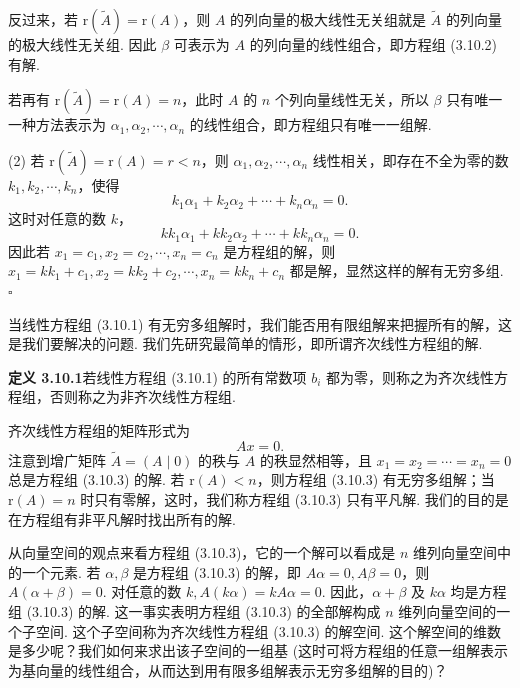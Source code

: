 \documentclass[UTF8,12pt,a4paper,fontset=fandol]{ctexart}
\begin{document}
反过来，若 $\mathrm{r}(\widetilde{A})=\mathrm{r}(A)$，则 $A$ 的列向量的极大线性无关组就是 $\widetilde{A}$ 的列向量的极大线性无关组. 因此 $\beta$ 可表示为 $A$ 的列向量的线性组合，即方程组 (3.10.2) 有解.

若再有 $\mathrm{r}(\widetilde{A})=\mathrm{r}(A)=n$，此时 $A$ 的 $n$ 个列向量线性无关，所以 $\beta$ 只有唯一一种方法表示为 $\alpha_1,\alpha_2,\cdots,\alpha_n$ 的线性组合，即方程组只有唯一一组解.

(2) 若 $\mathrm{r}(\widetilde{A})=\mathrm{r}(A)=r<n$，则 $\alpha_1,\alpha_2,\cdots,\alpha_n$ 线性相关，即存在不全为零的数 $k_1,k_2,\cdots,k_n$，使得
\[
k_1\alpha_1+k_2\alpha_2+\cdots+k_n\alpha_n=0.
\]
这时对任意的数 $k$，
\[
kk_1\alpha_1+kk_2\alpha_2+\cdots+kk_n\alpha_n=0.
\]
因此若 $x_1=c_1,x_2=c_2,\cdots,x_n=c_n$ 是方程组的解，则 $x_1=kk_1+c_1,x_2=kk_2+c_2,\cdots,x_n=kk_n+c_n$ 都是解，显然这样的解有无穷多组. $\square$

当线性方程组 (3.10.1) 有无穷多组解时，我们能否用有限组解来把握所有的解，这是我们要解决的问题. 我们先研究最简单的情形，即所谓齐次线性方程组的解.

\noindent\textbf{定义 3.10.1}\quad 若线性方程组 (3.10.1) 的所有常数项 $b_i$ 都为零，则称之为齐次线性方程组，否则称之为非齐次线性方程组.

齐次线性方程组的矩阵形式为
\begin{equation}
Ax=0.
\tag{3.10.3}
\end{equation}
注意到增广矩阵 $\widetilde{A}=(A\mid 0)$ 的秩与 $A$ 的秩显然相等，且 $x_1=x_2=\cdots=x_n=0$ 总是方程组 (3.10.3) 的解. 若 $\mathrm{r}(A)<n$，则方程组 (3.10.3) 有无穷多组解；当 $\mathrm{r}(A)=n$ 时只有零解，这时，我们称方程组 (3.10.3) 只有平凡解. 我们的目的是在方程组有非平凡解时找出所有的解.

从向量空间的观点来看方程组 (3.10.3)，它的一个解可以看成是 $n$ 维列向量空间中的一个元素. 若 $\alpha,\beta$ 是方程组 (3.10.3) 的解，即 $A\alpha=0,A\beta=0$，则 $A(\alpha+\beta)=0$. 对任意的数 $k,A(k\alpha)=kA\alpha=0$. 因此，$\alpha+\beta$ 及 $k\alpha$ 均是方程组 (3.10.3) 的解. 这一事实表明方程组 (3.10.3) 的全部解构成 $n$ 维列向量空间的一个子空间. 这个子空间称为齐次线性方程组 (3.10.3) 的解空间. 这个解空间的维数是多少呢？我们如何来求出该子空间的一组基 (这时可将方程组的任意一组解表示为基向量的线性组合，从而达到用有限多组解表示无穷多组解的目的)？
\end{document}
